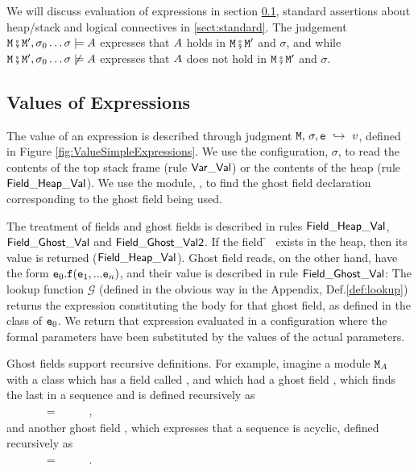 We will discuss evaluation of expressions in section \ref{sect:expressions}, standard assertions about heap/stack and logical
 connectives in \ref{sect:standard}. 
 The judgement ${\mbox{\tt{\ensuremath{{\mbox{\tt{M}}}}}}}\fatsemi {\mbox{\tt{\ensuremath{{\mbox{\tt{M}}}}}}}', \sigma_0 \ldots  \sigma  \models A$ expresses that $A$ holds in  ${\mbox{\tt{\ensuremath{{\mbox{\tt{M}}}}}}}\fatsemi {\mbox{\tt{\ensuremath{{\mbox{\tt{M}}}}}}}'$ and $\sigma$, and 
while ${\mbox{\tt{\ensuremath{{\mbox{\tt{M}}}}}}}\fatsemi {\mbox{\tt{\ensuremath{{\mbox{\tt{M}}}}}}}', \sigma_0 \ldots   \sigma  \not\models A$  expresses that $A$ does not hold  in  ${\mbox{\tt{\ensuremath{{\mbox{\tt{M}}}}}}}\fatsemi {\mbox{\tt{\ensuremath{{\mbox{\tt{M}}}}}}}'$ and $\sigma$.
 
\subsection{Values of Expressions}
\label{sect:expressions}

The value  of  an expression  is described through judgment $ {\mbox{\tt{\ensuremath{{\mbox{\tt{M}}}}}}},\, \sigma, {\mbox{\tt{e}}} \ \hookrightarrow\  v$,
defined in  Figure \ref{fig:ValueSimpleExpressions}.
We use the configuration, $\sigma$, to read the contents of the top stack frame
(rule ${\sf {Var\_Val}}$) or the contents of the heap (rule
${\sf {Field\_Heap\_Val}}$). We use the module, \M, to find the  ghost field declaration corresponding to the
ghost field being used. 


The treatment of fields and ghost fields is described in rules ${\sf {Field\_Heap\_Val}}$,\\  ${\sf {Field\_Ghost\_Val}}$ and 
${\sf {Field\_Ghost\_Val2}}$.  If the field \f~ exists in the heap, then its value is returned (${\sf {Field\_Heap\_Val}}$). 
Ghost field reads, on the other hand, have the form ${\mbox{\tt{e}}}_0.{\mbox{\tt{f}}}({\mbox{\tt{e}}}_1,...{\mbox{\tt{e}}}_n)$, and their value is
described in rule ${\sf {Field\_Ghost\_Val}}$:
%
The lookup function $\mathcal G$  (defined in the obvious way in the Appendix, Def.\ref{def:lookup})
returns the expression constituting the body for that ghost field, as defined in the class of ${\mbox{\tt{e}}}_0$.
We return  that expression
evaluated in a configuration where the formal parameters have been substituted by the values of the actual
parameters.

Ghost fields support recursive definitions. For example, imagine a module ${\mbox{\tt{\ensuremath{{\mbox{\tt{M}}}}}}}_A$ with
a class  which has a field called , and which 
had a ghost field , which finds  the last  in a sequence
and is defined recursively as \\
$~ \strut \hspace{.1cm}$ \ \ \ \ \ =\   \  \  \ ,\\
and another ghost field , which expresses that a sequence is acyclic,
defined recursively as \\
$~ \strut \hspace{.1cm}$ \ \ \ \ \ =\   \  \  \ .

